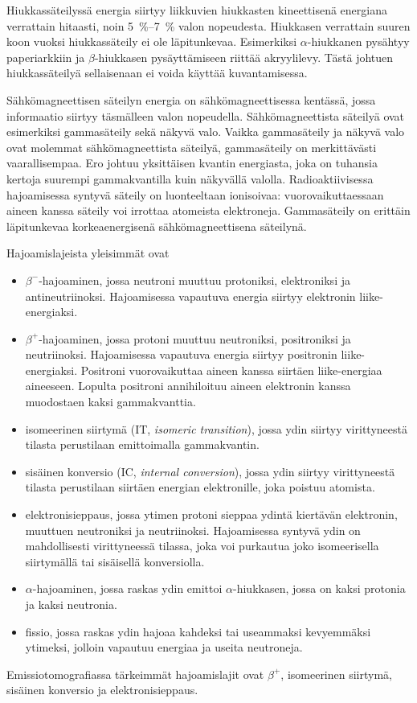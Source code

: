 Hiukkassäteilyssä energia siirtyy liikkuvien hiukkasten kineettisenä energiana verrattain hitaasti, noin \qtyrange{5}{7}{\percent} valon nopeudesta. Hiukkasen verrattain suuren koon vuoksi hiukkassäteily ei ole läpitunkevaa. Esimerkiksi $\alpha$-hiukkanen pysähtyy paperiarkkiin ja $\beta$-hiukkasen pysäyttämiseen riittää akryylilevy.\cite{cherry_interaction_2012} Tästä johtuen hiukkassäteilyä sellaisenaan ei voida käyttää kuvantamisessa\cite{cherry_gamma_2012}.

Sähkömagneettisen säteilyn energia on sähkömagneettisessa kentässä, jossa informaatio siirtyy täsmälleen valon nopeudella.\cite{cherry_basic_2012} Sähkömagneettista säteilyä ovat esimerkiksi gammasäteily sekä näkyvä valo. Vaikka gammasäteily ja näkyvä valo ovat molemmat sähkömagneettista säteilyä, gammasäteily on merkittävästi vaarallisempaa. Ero johtuu yksittäisen kvantin energiasta, joka on tuhansia kertoja suurempi gammakvantilla kuin näkyvällä valolla. Radioaktiivisessa hajoamisessa syntyvä säteily on luonteeltaan ionisoivaa: vuorovaikuttaessaan aineen kanssa säteily voi irrottaa atomeista elektroneja\cite{cherry_interaction_2012}. Gammasäteily on erittäin läpitunkevaa korkeaenergisenä sähkömagneettisena säteilynä.

Hajoamislajeista yleisimmät ovat\cite{cherry_modes_2012}
\begin{itemize}
    \item $\beta^{-}$-hajoaminen, jossa neutroni muuttuu protoniksi, elektroniksi ja antineutriinoksi.  Hajoamisessa vapautuva energia siirtyy elektronin liike-energiaksi.
    \item $\beta^{+}$-hajoaminen, jossa protoni muuttuu neutroniksi, positroniksi ja neutriinoksi. Hajoamisessa vapautuva energia siirtyy positronin liike-energiaksi. Positroni vuorovaikuttaa aineen kanssa siirtäen liike-energiaa aineeseen. Lopulta positroni annihiloituu aineen elektronin kanssa muodostaen kaksi gammakvanttia.
    \item isomeerinen siirtymä (IT, \textit{isomeric transition}), jossa ydin siirtyy virittyneestä tilasta perustilaan emittoimalla gammakvantin.
    \item sisäinen konversio (IC, \textit{internal conversion}), jossa ydin siirtyy virittyneestä tilasta perustilaan siirtäen energian elektronille, joka poistuu atomista.
    \item elektronisieppaus, jossa ytimen protoni sieppaa ydintä kiertävän elektronin, muuttuen neutroniksi ja neutriinoksi. Hajoamisessa syntyvä ydin on mahdollisesti virittyneessä tilassa, joka voi purkautua joko isomeerisella siirtymällä tai sisäisellä konversiolla.
    \item $\alpha$-hajoaminen, jossa raskas ydin emittoi $\alpha$-hiukkasen, jossa on kaksi protonia ja kaksi neutronia.
    \item fissio, jossa raskas ydin hajoaa kahdeksi tai useammaksi kevyemmäksi ytimeksi, jolloin vapautuu energiaa ja useita neutroneja.
\end{itemize}
Emissiotomografiassa tärkeimmät hajoamislajit ovat $\beta^{+}$, isomeerinen siirtymä, sisäinen konversio ja elektronisieppaus\cite{cherry_modes_2012}.


